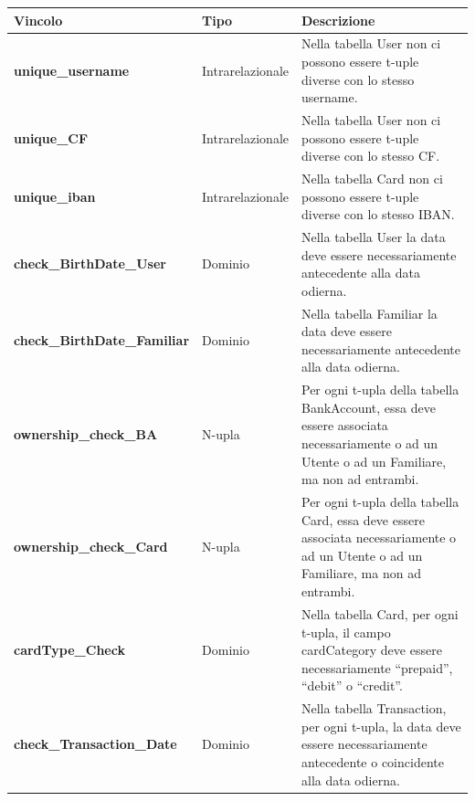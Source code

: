 \begin{longtable}{m{5.2cm}|m{2.8cm}|m{5.3cm}}
    
    \rowcolor{black!10}
    \textbf{Vincolo} & \textbf{Tipo} & \textbf{Descrizione} \\ \hline
    \endhead

    \raggedright \textbf{unique\_username} & \raggedright Intrarelazionale &
    Nella tabella User non ci possono essere t-uple diverse con lo stesso username. \\ \hline

    \raggedright \textbf{unique\_CF} & \raggedright Intrarelazionale &
    Nella tabella User non ci possono essere t-uple diverse con lo stesso CF. \\ \hline

    \raggedright \textbf{unique\_iban} & \raggedright Intrarelazionale &
    Nella tabella Card non ci possono essere t-uple diverse con lo stesso IBAN. \\ \hline

    \raggedright \textbf{check\_BirthDate\_User} & \raggedright Dominio &
    Nella tabella User la data deve essere necessariamente antecedente alla data odierna. \\ \hline

    \raggedright \textbf{check\_BirthDate\_Familiar} & \raggedright Dominio &
    Nella tabella Familiar la data deve essere necessariamente antecedente alla data odierna. \\ \hline

    \raggedright \textbf{ownership\_check\_BA} & \raggedright N-upla &
    Per ogni t-upla della tabella BankAccount, essa deve essere associata necessariamente o ad un Utente o ad un Familiare, ma non ad entrambi. \\ \hline

    \raggedright \textbf{ownership\_check\_Card} & \raggedright N-upla &
    Per ogni t-upla della tabella Card, essa deve essere associata necessariamente o ad un Utente o ad un Familiare, ma non ad entrambi. \\ \hline

    \raggedright \textbf{cardType\_Check} & \raggedright Dominio &
    Nella tabella Card, per ogni t-upla, il campo cardCategory deve essere necessariamente “prepaid”, “debit” o “credit”. \\ \hline

    \raggedright \textbf{check\_Transaction\_Date} & \raggedright Dominio &
    Nella tabella Transaction, per ogni t-upla, la data deve essere necessariamente antecedente o coincidente alla data odierna. \\ \hline


\end{longtable}

